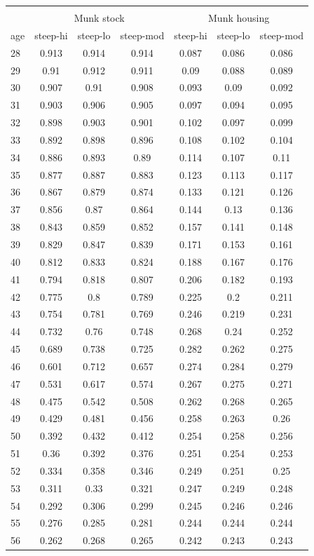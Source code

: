 \documentclass[]{article}
\begin{document}
\begin{appendix}
\begin{longtable}{|l|ccc|ccc|}
		\hline
\multicolumn{7}{c}{}\\
		&\multicolumn{3}{c|}{Munk stock}&\multicolumn{3}{c|}{Munk housing}\\
		\hline
		age&steep-hi&steep-lo&steep-mod&steep-hi&steep-lo&steep-mod\\
		\hline
28&0.913&0.914&0.914&0.087&0.086&0.086\\
29&0.91&0.912&0.911&0.09&0.088&0.089\\
30&0.907&0.91&0.908&0.093&0.09&0.092\\
31&0.903&0.906&0.905&0.097&0.094&0.095\\
32&0.898&0.903&0.901&0.102&0.097&0.099\\
33&0.892&0.898&0.896&0.108&0.102&0.104\\
34&0.886&0.893&0.89&0.114&0.107&0.11\\
35&0.877&0.887&0.883&0.123&0.113&0.117\\
36&0.867&0.879&0.874&0.133&0.121&0.126\\
37&0.856&0.87&0.864&0.144&0.13&0.136\\
38&0.843&0.859&0.852&0.157&0.141&0.148\\
39&0.829&0.847&0.839&0.171&0.153&0.161\\
40&0.812&0.833&0.824&0.188&0.167&0.176\\
41&0.794&0.818&0.807&0.206&0.182&0.193\\
42&0.775&0.8&0.789&0.225&0.2&0.211\\
43&0.754&0.781&0.769&0.246&0.219&0.231\\
44&0.732&0.76&0.748&0.268&0.24&0.252\\
45&0.689&0.738&0.725&0.282&0.262&0.275\\
46&0.601&0.712&0.657&0.274&0.284&0.279\\
47&0.531&0.617&0.574&0.267&0.275&0.271\\
48&0.475&0.542&0.508&0.262&0.268&0.265\\
49&0.429&0.481&0.456&0.258&0.263&0.26\\
50&0.392&0.432&0.412&0.254&0.258&0.256\\
51&0.36&0.392&0.376&0.251&0.254&0.253\\
52&0.334&0.358&0.346&0.249&0.251&0.25\\
53&0.311&0.33&0.321&0.247&0.249&0.248\\
54&0.292&0.306&0.299&0.245&0.246&0.246\\
55&0.276&0.285&0.281&0.244&0.244&0.244\\
56&0.262&0.268&0.265&0.242&0.243&0.243\\
		\hline
	\end{longtable}






\end{appendix}
\end{document}

